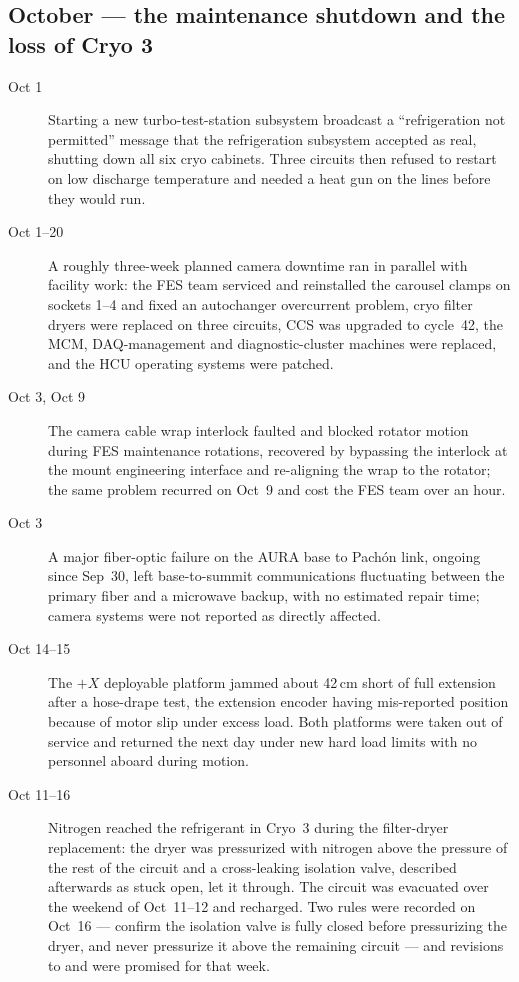 \subsection{October --- the maintenance shutdown and the loss of Cryo 3}
\begin{description}
\item[Oct 1] Starting a new turbo-test-station subsystem broadcast a
  ``refrigeration not permitted'' message that the refrigeration
  subsystem accepted as real, shutting down all six cryo cabinets.
  Three circuits then refused to restart on low discharge temperature
  and needed a heat gun on the lines before they would run.

\item[Oct 1--20] A roughly three-week planned camera downtime ran in
  parallel with facility work: the FES team serviced and reinstalled
  the carousel clamps on sockets 1--4 and fixed an autochanger
  overcurrent problem, cryo filter dryers were replaced on three
  circuits, CCS was upgraded to cycle~42, the MCM, DAQ-management and
  diagnostic-cluster machines were replaced, and the HCU operating
  systems were patched.

\item[Oct 3, Oct 9] The camera cable wrap interlock faulted and
  blocked rotator motion during FES maintenance rotations, recovered by
  bypassing the interlock at the mount engineering interface and
  re-aligning the wrap to the rotator; the same problem recurred on
  Oct~9 and cost the FES team over an hour.

\item[Oct 3] A major fiber-optic failure on the AURA base to Pachón
  link, ongoing since Sep~30, left base-to-summit communications
  fluctuating between the primary fiber and a microwave backup, with
  no estimated repair time; camera systems were not reported as
  directly affected.

\item[Oct 14--15] The $+X$ deployable platform jammed about 42\,cm
  short of full extension after a hose-drape test, the extension
  encoder having mis-reported position because of motor slip under
  excess load.  Both platforms were taken out of service and returned
  the next day under new hard load limits with no personnel aboard
  during motion.

\item[Oct 11--16] Nitrogen reached the refrigerant in Cryo~3 during the
  filter-dryer replacement: the dryer was pressurized with nitrogen
  above the pressure of the rest of the circuit and a cross-leaking
  isolation valve, described afterwards as stuck open, let it through.
  The circuit was evacuated over the weekend of Oct~11--12 and
  recharged.  Two rules were recorded on Oct~16 --- confirm the
  isolation valve is fully closed before pressurizing the dryer, and
  never pressurize it above the remaining circuit --- and revisions to
   and  were promised for that
  week.


\end{description}
